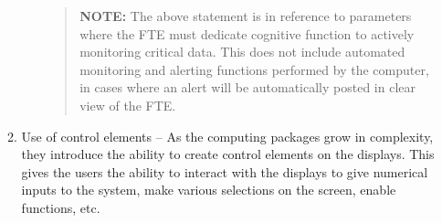 \documentclass[
]{book}
\begin{document}
\begin{enumerate}
\begin{enumerate}
\begin{enumerate}
      \begin{quote}
      \textbf{NOTE:} The above statement is in reference to parameters where the FTE must dedicate cognitive function to actively monitoring critical data. This does not include automated monitoring and alerting functions performed by the computer, in cases where an alert will be automatically posted in clear view of the FTE.
      \end{quote}
    \end{enumerate}
  \item
    Use of control elements -- As the computing packages grow in complexity, they introduce the ability to create control elements on the displays. This gives the users the ability to interact with the displays to give numerical inputs to the system, make various selections on the screen, enable functions, etc.


\end{enumerate}
\end{enumerate}
\end{document}
